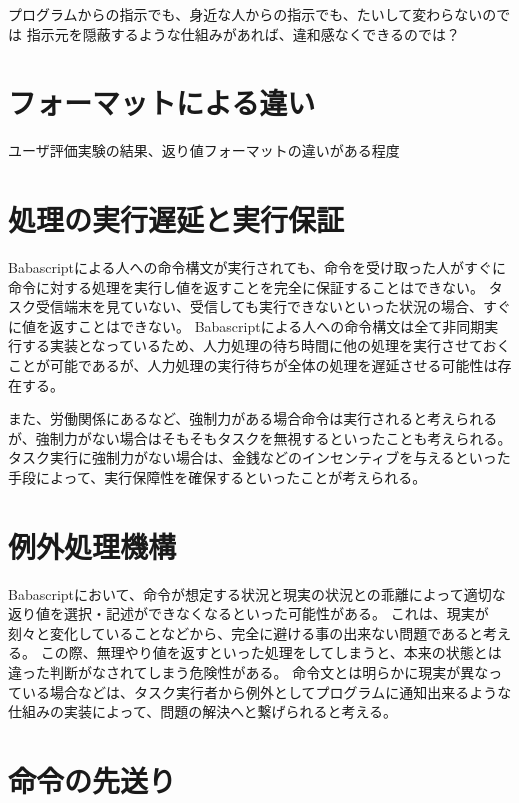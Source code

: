 プログラムからの指示でも、身近な人からの指示でも、たいして変わらないのでは
指示元を隠蔽するような仕組みがあれば、違和感なくできるのでは？

\section{フォーマットによる違い}\label{ux30d5ux30a9ux30fcux30deux30c3ux30c8ux306bux3088ux308bux9055ux3044}

ユーザ評価実験の結果、返り値フォーマットの違いがある程度

\section{処理の実行遅延と実行保証}\label{ux51e6ux7406ux306eux5b9fux884cux9045ux5ef6ux3068ux5b9fux884cux4fddux8a3c}

Babascriptによる人への命令構文が実行されても、命令を受け取った人がすぐに命令に対する処理を実行し値を返すことを完全に保証することはできない。
タスク受信端末を見ていない、受信しても実行できないといった状況の場合、すぐに値を返すことはできない。
Babascriptによる人への命令構文は全て非同期実行する実装となっているため、人力処理の待ち時間に他の処理を実行させておくことが可能であるが、人力処理の実行待ちが全体の処理を遅延させる可能性は存在する。

また、労働関係にあるなど、強制力がある場合命令は実行されると考えられるが、強制力がない場合はそもそもタスクを無視するといったことも考えられる。
タスク実行に強制力がない場合は、金銭などのインセンティブを与えるといった手段によって、実行保障性を確保するといったことが考えられる。

\section{例外処理機構}\label{ux4f8bux5916ux51e6ux7406ux6a5fux69cb}

Babascriptにおいて、命令が想定する状況と現実の状況との乖離によって適切な返り値を選択・記述ができなくなるといった可能性がある。
これは、現実が刻々と変化していることなどから、完全に避ける事の出来ない問題であると考える。
この際、無理やり値を返すといった処理をしてしまうと、本来の状態とは違った判断がなされてしまう危険性がある。
命令文とは明らかに現実が異なっている場合などは、タスク実行者から例外としてプログラムに通知出来るような仕組みの実装によって、問題の解決へと繋げられると考える。

\section{命令の先送り}\label{ux547dux4ee4ux306eux5148ux9001ux308a}


